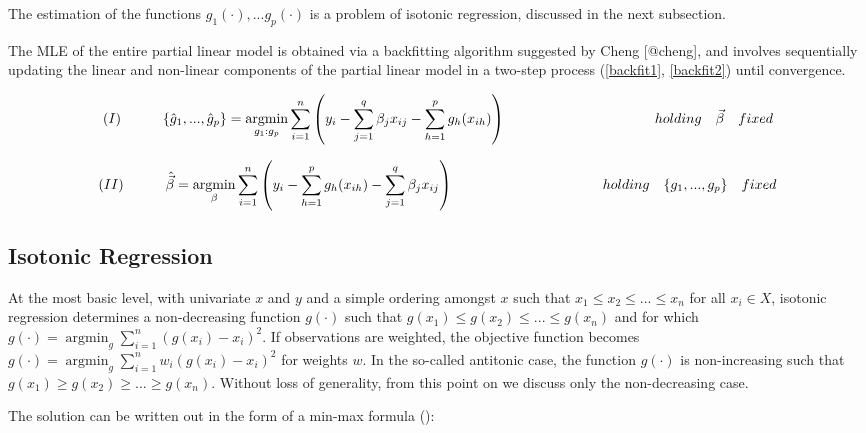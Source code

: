\documentclass[fleqn,10pt]{olplainarticle}\usepackage[]{graphicx}\usepackage[]{color}
\DeclareMathOperator*{\argmin}{argmin}
\begin{document}
The estimation of the functions $g_1(\cdot),...g_p(\cdot)$ is a problem of isotonic regression, discussed in the next subsection.

The MLE of the entire partial linear model is obtained via a backfitting algorithm suggested by Cheng [@cheng], and involves sequentially updating the linear and non-linear components of the partial linear model in a two-step process (\ref{backfit1}, \ref{backfit2}) until convergence.

\begin{equation} \label{backfit1}
  (I) \ \ \ \ \ \ \ \ \ \{\hat{g}_1,...,\hat{g}_p\} = \underset{g_1:g_p}{\operatorname{argmin}} \sum_{i=1}^n\left(y_i-\sum_{j=1}^{q} \beta_{j} x_{ij}-\sum_{h=1}^{p} g_{h} (x_{ih})\right) \\
  \ \ \ \ \ \ \ \ \ \ \ \ \ \ \ \ \ \ \ \ \ \ \ \ \ \ \ \ \ \ \ \  holding \ \ \ \vec\beta \ \ \ fixed
\end{equation}


\begin{equation} \label{backfit2}
  (II) \ \ \ \ \ \ \ \ \ \hat{\vec\beta} = \underset{\beta}{\operatorname{argmin}} \sum_{i=1}^n\left(y_i-\sum_{h=1}^{p} g_{h} (x_{ih}) - \sum_{j=1}^{q} \beta_{j} x_{ij}\right) \\
  \ \ \ \ \ \ \ \ \ \ \ \ \ \ \ \ \ \ \ \ \ \ \ \ \ \ \ \ \ \ \ \  holding \ \ \ \{g_1,...,g_p\} \ \ \ fixed
\end{equation}


\subsection{Isotonic Regression}

At the most basic level, with univariate $x$ and $y$ and a simple ordering amongst $x$ such that \( x_{1} \leq x_{2} \leq ... \leq x_{n} \) for all \( x_{i} \in X \), isotonic regression determines a non-decreasing function $g(\cdot)$ such that \( g(x_{1}) \leq g(x_{2}) \leq ... \leq g(x_{n}) \) and for which \( g(\cdot) = \argmin_{g} \sum_{i=1}^{n}(g(x_{i}) - x_{i})^2 \). If observations are weighted, the objective function becomes \( g(\cdot) = \argmin_{g} \sum_{i=1}^{n}w_{i}(g(x_{i}) - x_{i})^2 \) for weights $w$. In the so-called antitonic case, the function $g(\cdot)$ is non-increasing such that \( g(x_{1}) \geq g(x_{2}) \geq ... \geq g(x_{n}) \). Without loss of generality, from this point on we discuss only the non-decreasing case.

The solution can be written out in the form of a min-max formula (\cite{jordan}):
\end{document}
